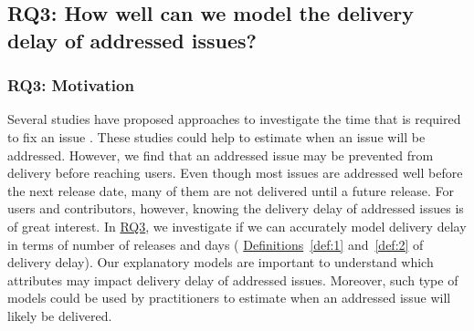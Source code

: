 \subsection{RQ3: How well can we model the delivery delay of
addressed issues?}\label{ch4:rq3}

\subsubsection*{RQ3: Motivation} 

Several studies have proposed approaches to investigate the time that is
required to fix an issue \cite{Anbalagan2009,Giger2010, Kim2006, Marks2011,
Weib2007, Zhang2013}. These studies could help to estimate when an issue will be
addressed. However, we find that an addressed issue may be prevented from
delivery before reaching users. Even though most issues are addressed well before the next
release date, many of them are not delivered until a future release. For users
and contributors, however, knowing the delivery delay of addressed issues is of
great interest. In \hyperref[ch4:rq3]{RQ3}, we investigate if we can accurately
model delivery delay in terms of number of releases and days (\ie
\hyperref[def:1]{Definitions}~\ref{def:1} and~\ref{def:2} of delivery delay).
Our explanatory models are important to understand which attributes may impact
delivery delay of addressed issues. Moreover, such type of models could be used by
practitioners to estimate when an addressed issue will likely be delivered.

